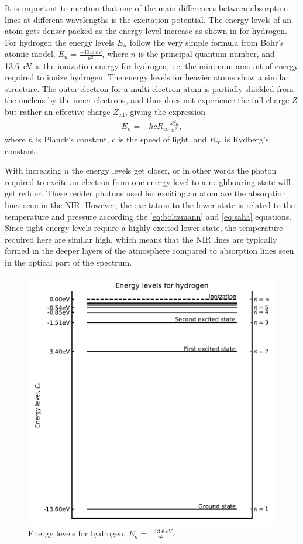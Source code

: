 {It is important to mention that one of the main differences between absorption lines at different
wavelengths is the excitation potential. The energy levels of an atom gets denser packed as the
energy level increase as shown in  for hydrogen. For hydrogen the energy levels
$E_n$ follow the very simple formula from Bohr's atomic model, $E_n=\frac{\SI{-13.6}{eV}}{n^2}$,
where $n$ is the principal quantum number, and \SI{13.6}{eV} is the ionization energy for hydrogen,
i.e. the minimum amount of energy required to ionize hydrogen. The energy levels for heavier atoms
show a similar structure. The outer electron for a multi-electron atom is partially shielded from
the nucleus by the inner electrons, and thus does not experience the full charge $Z$ but rather an
effective charge $Z_\mathrm{eff}$, giving the expression
\begin{align}
  E_n = -hcR_\infty\frac{Z_\mathrm{eff}^2}{n^2},
\end{align}
where $h$ is Planck's constant, $c$ is the speed of light, and $R_\infty$ is Rydberg's constant.

With increasing $n$ the energy levels get closer, or in other words the photon required to excite an
electron from one energy level to a neighbouring state will get redder. These redder photons used
for exciting an atom are the absorption lines seen in the NIR. However, the excitation to the lower
state is related to the temperature and pressure according the \ref{eq:boltzmann} and \ref{eq:saha}
equations. Since tight energy levels require a highly excited lower state, the temperature required
here are similar high, which means that the NIR lines are typically formed in the deeper layers of
the atmosphere compared to absorption lines seen in the optical part of the spectrum.

\begin{figure}[htpb!]
    \centering
    \includegraphics[width=0.85\linewidth]{figures/energyLevels.pdf}
    \caption{Energy levels for hydrogen, $E_n=\frac{\SI{-13.6}{eV}}{n^2}$.}
    \label{fig:elevel}
\end{figure}

}
